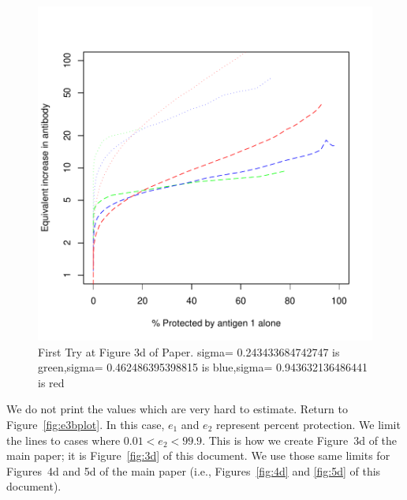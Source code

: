 \documentclass{article}[12pt]
\begin{document}
\begin{figure}
\caption{First Try at Figure 3d of Paper.
sigma= 0.243433684742747  is  green,sigma= 0.462486395398815  is  blue,sigma= 0.943632136486441  is  red
 \label{fig:firsttry3d} }
\includegraphics{hbimdetails-figfirsttry3d}
\end{figure}

We do not print the values which are very hard to estimate. 
Return to Figure~\ref{fig:e3bplot}. In this case, $e_1$ and $e_2$ represent percent protection. 
We limit the lines to cases where $0.01< e_2<99.9$. 
This is how we create Figure~3d of the main paper; it is Figure~\ref{fig:3d} of this document. 
We use those same limits for Figures~4d and 5d of the main paper
(i.e., Figures~\ref{fig:4d} and \ref{fig:5d} of this document).
  
\end{document}
